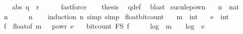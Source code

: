 \begin{isabellebody}
\ \ \isamarkupfalse%
\ \isamarkupfalse%
\ {\isachardoublequoteopen}abs\ q\ {\isasymle}\ {}{\isacharcircum}{\kern0pt}{\isacharparenleft}{\kern0pt}r{\isacharplus}{\kern0pt}{}{\isacharparenright}{\kern0pt}{\isachardoublequoteclose}\isanewline
\ \ \ \ \isamarkupfalse%
\ fastforce\isanewline
\ \ \isamarkupfalse%
\ {\isacharquery}{\kern0pt}thesis\ \isamarkupfalse%
\ q{\isacharunderscore}{\kern0pt}def\ \isamarkupfalse%
\ blast\isanewline
{}\isamarkupfalse%
%
\endisatagproof
{\isafoldproof}%
%
\isadelimproof
\isanewline
%
\endisadelimproof
\isanewline
{}\isamarkupfalse%
\ suc{\isacharunderscore}{\kern0pt}n{\isacharunderscore}{\kern0pt}le{\isacharunderscore}{\kern0pt}{}{\isacharunderscore}{\kern0pt}pow{\isacharunderscore}{\kern0pt}n{\isacharcolon}{\kern0pt}\isanewline
\ \ \ n\ {\isacharcolon}{\kern0pt}{\isacharcolon}{\kern0pt}\ nat\isanewline
\ \ \ {\isachardoublequoteopen}n\ {\isacharplus}{\kern0pt}\ {}\ {\isasymle}\ {}\ {\isacharcircum}{\kern0pt}\ n{\isachardoublequoteclose}\isanewline
%
\isadelimproof
\ \ %
\endisadelimproof
%
\isatagproof
{}\isamarkupfalse%
\ {\isacharparenleft}{\kern0pt}induction\ n{\isacharcomma}{\kern0pt}\ simp{\isacharcomma}{\kern0pt}\ simp{\isacharparenright}{\kern0pt}%
\endisatagproof
{\isafoldproof}%
%
\isadelimproof
\isanewline
%
\endisadelimproof
\isanewline
{}\isamarkupfalse%
\ float{\isacharunderscore}{\kern0pt}bit{\isacharunderscore}{\kern0pt}count{\isacharcolon}{\kern0pt}\isanewline
\ \ \ m\ {\isacharcolon}{\kern0pt}{\isacharcolon}{\kern0pt}\ int\isanewline
\ \ \ e\ {\isacharcolon}{\kern0pt}{\isacharcolon}{\kern0pt}\ int\isanewline
\ \ \ {\isachardoublequoteopen}f\ {\isasymequiv}\ float{\isacharunderscore}{\kern0pt}of\ {\isacharparenleft}{\kern0pt}m\ {\isacharasterisk}{\kern0pt}\ {}\ powr\ e{\isacharparenright}{\kern0pt}{\isachardoublequoteclose}\isanewline
\ \ \ {\isachardoublequoteopen}bit{\isacharunderscore}{\kern0pt}count\ {\isacharparenleft}{\kern0pt}F\isactrlsub S\ f{\isacharparenright}{\kern0pt}\ {\isasymle}\ {}\ {\isacharplus}{\kern0pt}\ {}\ {\isacharasterisk}{\kern0pt}\ {\isacharparenleft}{\kern0pt}log\ {}\ {\isacharparenleft}{\kern0pt}{\isasymbar}m{\isasymbar}\ {\isacharplus}{\kern0pt}\ {}{\isacharparenright}{\kern0pt}\ {\isacharplus}{\kern0pt}\ log\ {}\ {\isacharparenleft}{\kern0pt}{\isasymbar}e{\isasymbar}\ {\isacharplus}{\kern0pt}\ {}{\isacharparenright}{\kern0pt}{\isacharparenright}{\kern0pt}{\isachardoublequoteclose}\isanewline

\end{isabellebody}
